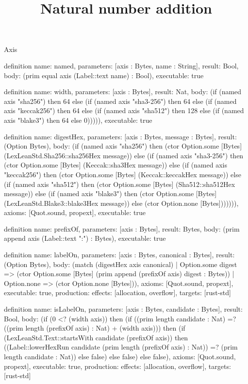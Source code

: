 \begin{lexlean}{Axis}
\title{Natural number addition}
\begin{semanticmodule}
definition{
  name: named,
  parameters: [axis : Bytes, name : String],
  result: Bool,
  body: (prim equal axis (Label::text name) : Bool),
  executable: true
}

definition{
  name: width,
  parameters: [axis : Bytes],
  result: Nat,
  body: (if (named axis "sha256") then 64 else (if (named axis "sha3-256") then 64 else (if (named axis "keccak256") then 64 else (if (named axis "sha512") then 128 else (if (named axis "blake3") then 64 else 0))))),
  executable: true
}

definition{
  name: digestHex,
  parameters: [axis : Bytes, message : Bytes],
  result: (Option Bytes),
  body: (if (named axis "sha256") then (ctor Option.some [Bytes] (LexLeanStd.Sha256::sha256Hex message)) else (if (named axis "sha3-256") then (ctor Option.some [Bytes] (Keccak::sha3Hex message)) else (if (named axis "keccak256") then (ctor Option.some [Bytes] (Keccak::keccakHex message)) else (if (named axis "sha512") then (ctor Option.some [Bytes] (Sha512::sha512Hex message)) else (if (named axis "blake3") then (ctor Option.some [Bytes] (LexLeanStd.Blake3::blake3Hex message)) else (ctor Option.none [Bytes])))))),
  axioms: [Quot.sound, propext],
  executable: true
}

definition{
  name: prefixOf,
  parameters: [axis : Bytes],
  result: Bytes,
  body: (prim append axis (Label::text ":") : Bytes),
  executable: true
}

definition{
  name: labelOn,
  parameters: [axis : Bytes, canonical : Bytes],
  result: (Option Bytes),
  body: (match (digestHex axis canonical)
    | Option.some digest => (ctor Option.some [Bytes] (prim append (prefixOf axis) digest : Bytes))
    | Option.none => (ctor Option.none [Bytes])),
  axioms: [Quot.sound, propext],
  executable: true,
  production: {effects: [allocation, overflow], targets: [rust-std]}
}

definition{
  name: isLabelOn,
  parameters: [axis : Bytes, candidate : Bytes],
  result: Bool,
  body: (if (0 <? (width axis)) then (if ((prim length candidate : Nat) =? ((prim length (prefixOf axis) : Nat) + (width axis))) then (if (LexLeanStd.Text::startsWith candidate (prefixOf axis)) then ((Label::lowerHexRun candidate (prim length (prefixOf axis) : Nat)) =? (prim length candidate : Nat)) else false) else false) else false),
  axioms: [Quot.sound, propext],
  executable: true,
  production: {effects: [allocation, overflow], targets: [rust-std]}
}


\end{semanticmodule}
\end{lexlean}
